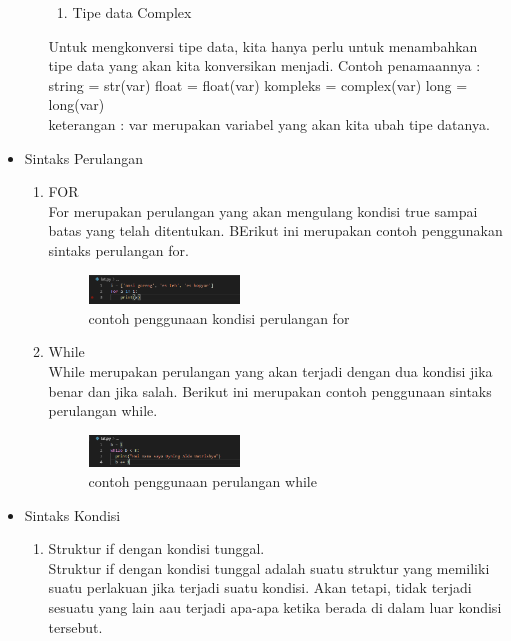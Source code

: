 \begin{itemize}
\begin{itemize}
\begin{enumerate}
					\item Tipe data Complex
				\end{enumerate}
				Untuk mengkonversi tipe data, kita hanya perlu untuk menambahkan tipe data yang akan kita konversikan menjadi. Contoh penamaannya :
				string = str(var) 
				float = float(var) 
				kompleks = complex(var) 
				long = long(var)\\
				keterangan : var merupakan variabel yang akan kita ubah tipe datanya.\\ 
		\end{itemize} 		
	\item Sintaks Perulangan
		\begin{enumerate}
			\item FOR\\
				For merupakan perulangan yang akan mengulang kondisi true sampai batas yang telah ditentukan. BErikut ini merupakan contoh penggunakan sintaks perulangan for.\\
				\begin{figure}[H]
				\includegraphics[width=4cm]{figures/1184030/for.png}
				\centering
				\caption{contoh penggunaan kondisi perulangan for}
				\end{figure}
			\item While\\
				While merupakan perulangan yang akan terjadi dengan dua kondisi jika benar dan jika salah. Berikut ini merupakan contoh penggunaan sintaks perulangan while.\\
				\begin{figure}[H]
				\includegraphics[width=4cm]{figures/1184030/while.png}
				\centering
				\caption{contoh penggunaan perulangan while}
				\end{figure}
		\end{enumerate}
	\item Sintaks Kondisi\\
		\begin{enumerate}
		\item Struktur if dengan kondisi tunggal.\\
			Struktur if dengan kondisi tunggal adalah suatu struktur yang memiliki suatu perlakuan jika terjadi suatu kondisi. Akan tetapi, tidak terjadi sesuatu yang lain aau terjadi apa-apa ketika berada di dalam luar kondisi tersebut.\\

\end{enumerate}
\end{itemize}
